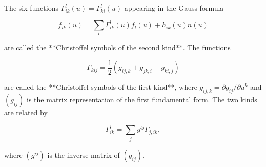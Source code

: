 The six functions $\Gamma_{ik}^l(u) = \Gamma_{ki}^l(u)$ appearing in the Gauss formula

$$
f_{ik}(u) = \sum_l \Gamma_{ik}^l(u) f_l(u) + h_{ik}(u) n(u)
$$

are called the **Christoffel symbols of the second kind**. The functions

$$
\Gamma_{kij} = \frac{1}{2}(g_{ij,k} + g_{jk,i} - g_{ki,j})
$$

are called the **Christoffel symbols of the first kind**, where $g_{ij,k} = \partial g_{ij} / \partial u^k$ and $(g_{ij})$ is the matrix representation of the first fundamental form. The two kinds are related by

$$
\Gamma_{ik}^l = \sum_j g^{lj} \Gamma_{j,ik},
$$

where $(g^{ij})$ is the inverse matrix of $(g_{ij})$.
